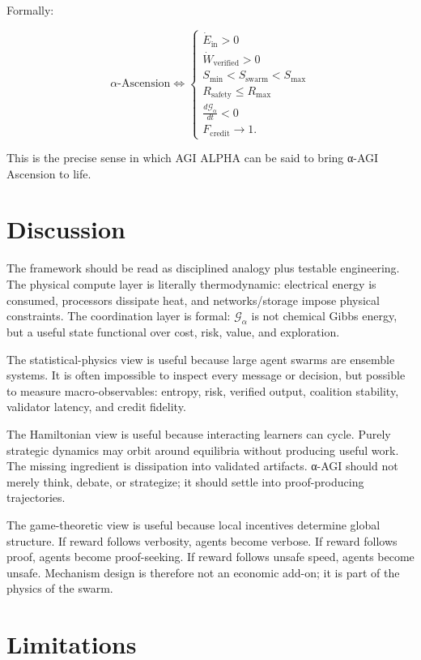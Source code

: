 \documentclass[11pt]{article}
\begin{document}
Formally:

\[
\alpha\text{-Ascension}
\iff
\begin{cases}
\dot{E}_{\text{in}}>0 \\
\dot{W}_{\text{verified}}>0 \\
S_{\min}<S_{\text{swarm}}<S_{\max} \\
R_{\text{safety}}\leq R_{\max} \\
\frac{d\mathcal{G}_{\alpha}}{dt}<0 \\
F_{\text{credit}}\rightarrow 1.
\end{cases}
\]

This is the precise sense in which AGI ALPHA can be said to bring α-AGI Ascension to life.

\section{Discussion}\label{discussion}

The framework should be read as disciplined analogy plus testable engineering. The physical compute layer is literally thermodynamic: electrical energy is consumed, processors dissipate heat, and networks/storage impose physical constraints. The coordination layer is formal: \(\mathcal{G}_{\alpha}\) is not chemical Gibbs energy, but a useful state functional over cost, risk, value, and exploration.

The statistical-physics view is useful because large agent swarms are ensemble systems. It is often impossible to inspect every message or decision, but possible to measure macro-observables: entropy, risk, verified output, coalition stability, validator latency, and credit fidelity.

The Hamiltonian view is useful because interacting learners can cycle. Purely strategic dynamics may orbit around equilibria without producing useful work. The missing ingredient is dissipation into validated artifacts. α-AGI should not merely think, debate, or strategize; it should settle into proof-producing trajectories.

The game-theoretic view is useful because local incentives determine global structure. If reward follows verbosity, agents become verbose. If reward follows proof, agents become proof-seeking. If reward follows unsafe speed, agents become unsafe. Mechanism design is therefore not an economic add-on; it is part of the physics of the swarm.

\section{Limitations}\label{limitations}
\end{document}
